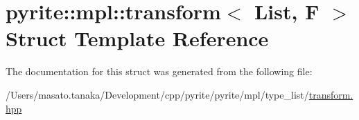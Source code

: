\hypertarget{structpyrite_1_1mpl_1_1transform}{}\section{pyrite\+:\+:mpl\+:\+:transform$<$ List, F $>$ Struct Template Reference}
\label{structpyrite_1_1mpl_1_1transform}


The documentation for this struct was generated from the following file\+:\begin{DoxyCompactItemize}
\item 
/\+Users/masato.\+tanaka/\+Development/cpp/pyrite/pyrite/mpl/type\+\_\+list/\mbox{\hyperlink{transform_8hpp}{transform.\+hpp}}\end{DoxyCompactItemize}
